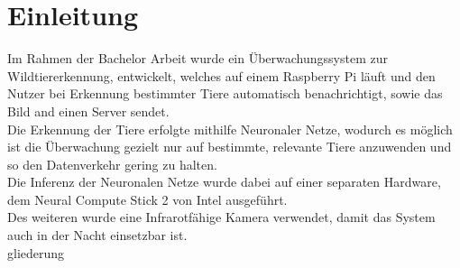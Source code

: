 \chapter{Einleitung}\label{kap:einleitung2}

Im Rahmen der Bachelor Arbeit wurde ein Überwachungssystem zur Wildtiererkennung,
entwickelt, welches auf einem Raspberry Pi läuft und den Nutzer bei Erkennung
bestimmter Tiere automatisch benachrichtigt, sowie das Bild and einen Server sendet.
\\
Die Erkennung der Tiere erfolgte mithilfe Neuronaler Netze, wodurch es möglich ist 
die Überwachung gezielt nur auf bestimmte, relevante Tiere anzuwenden und so den
Datenverkehr gering zu halten. 
\\
Die Inferenz der Neuronalen Netze wurde dabei auf einer separaten Hardware, dem 
Neural Compute Stick 2 von Intel ausgeführt.
\\
Des weiteren wurde eine Infrarotfähige Kamera verwendet, damit das System auch
in der Nacht einsetzbar ist.
\\
gliederung